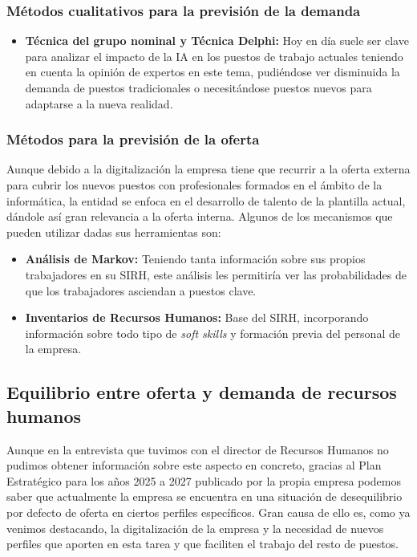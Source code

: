 \subsubsection{Métodos cualitativos para la previsión de la demanda}

\begin{itemize}
  \item \textbf{Técnica del grupo nominal y Técnica Delphi:} Hoy en día suele ser clave para analizar el impacto de la IA en los puestos de trabajo actuales teniendo en cuenta la opinión de expertos en este tema, pudiéndose ver disminuida la demanda de puestos tradicionales o necesitándose puestos nuevos para adaptarse a la nueva realidad.
\end{itemize}

\subsubsection{Métodos para la previsión de la oferta}

Aunque debido a la digitalización la empresa tiene que recurrir a la oferta externa para cubrir los nuevos puestos con profesionales formados en el ámbito de la informática, la entidad se enfoca en el desarrollo de talento de la plantilla actual, dándole así gran relevancia a la oferta interna. Algunos de los mecanismos que pueden utilizar dadas sus herramientas son:

\begin{itemize}
  \item \textbf{Análisis de Markov:} Teniendo tanta información sobre sus propios trabajadores en su SIRH, este análisis les permitiría ver las probabilidades de que los trabajadores asciendan a puestos clave.
  \item \textbf{Inventarios de Recursos Humanos:} Base del SIRH, incorporando información sobre todo tipo de \textit{soft skills} y formación previa del personal de la empresa.
\end{itemize}

\subsection{Equilibrio entre oferta y demanda de recursos humanos}

Aunque en la entrevista que tuvimos con el director de Recursos Humanos no pudimos obtener información sobre este aspecto en concreto, gracias al Plan Estratégico para los años 2025 a 2027 publicado por la propia empresa podemos saber que actualmente la empresa se encuentra en una situación de desequilibrio por defecto de oferta en ciertos perfiles específicos. Gran causa de ello es, como ya venimos destacando, la digitalización de la empresa y la necesidad de nuevos perfiles que aporten en esta tarea y que faciliten el trabajo del resto de puestos.

